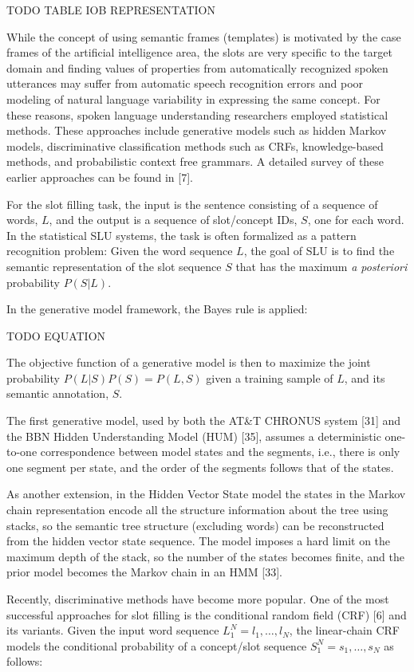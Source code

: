 TODO TABLE IOB REPRESENTATION

While the concept of using semantic frames (templates) is motivated by the case
frames of the artificial intelligence area, the slots are very specific to the
target domain and finding values of properties from automatically recognized
spoken utterances may suffer from automatic speech recognition errors and poor
modeling of natural language variability in expressing the same concept. For
these reasons, spoken language understanding researchers employed statistical
methods. These approaches include generative models such as hidden Markov
models, discriminative classification methods such as CRFs, knowledge-based
methods, and probabilistic context free grammars. A detailed survey of these
earlier approaches can be found in [7].

For the slot filling task, the input is the sentence consisting of a sequence
of words, $L$, and the output is a sequence of slot/concept IDs, $S$, one for each
word. In the statistical SLU systems, the task is often formalized as a pattern
recognition problem:  Given the word sequence $L$, the goal of SLU is to find the
semantic representation of the slot sequence $S$ that has the maximum {\it a
posteriori} probability $P(S | L)$. 

In the generative model framework, the Bayes rule is applied:

TODO EQUATION %

The objective function of a generative model is then to maximize the joint
probability $P(L | S)P(S) = P(L, S)$ given a training sample of $L$, and its semantic
annotation, $S$.

The first generative model, used by both the AT\&T CHRONUS system [31] and the
BBN Hidden Understanding Model (HUM) [35], assumes a deterministic one-to-one
correspondence between model states and the segments, i.e., there is only one
segment per state, and the order of the segments follows that of the states.  

As another extension, in the Hidden Vector State model the states in the
Markov chain representation encode all the structure information about the
tree using stacks, so the semantic tree structure (excluding words) can be
reconstructed from the hidden vector state sequence. The model imposes a hard
limit on the maximum depth of the stack, so the number of the states becomes
finite, and the prior model becomes the Markov chain in an HMM [33].

Recently, discriminative methods have become more popular. One of the most
successful approaches for slot filling is the conditional random field (CRF)
[6] and its variants. Given the input word sequence $L_1^N=l_1,\dots,l_N$, the
linear-chain CRF models the conditional probability of a concept/slot sequence
$S_1^N=s_1,\dots,s_N$ as follows:

